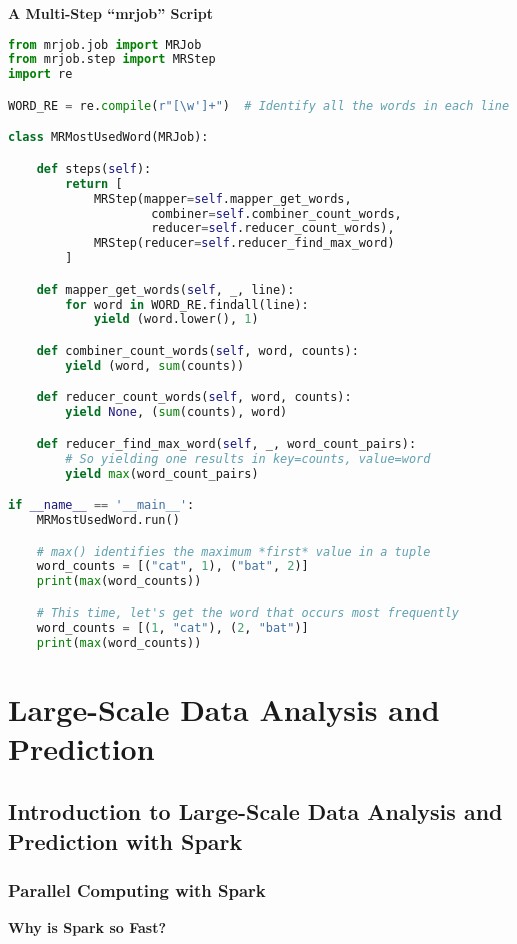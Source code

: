 \documentclass{article}
\begin{document}
\textbf{A Multi-Step ``mrjob'' Script}
\begin{lstlisting}[language=Python]
from mrjob.job import MRJob 
from mrjob.step import MRStep
import re

WORD_RE = re.compile(r"[\w']+")  # Identify all the words in each line of text

class MRMostUsedWord(MRJob):

    def steps(self):
        return [
            MRStep(mapper=self.mapper_get_words,
                    combiner=self.combiner_count_words,
                    reducer=self.reducer_count_words),
            MRStep(reducer=self.reducer_find_max_word)
        ]

    def mapper_get_words(self, _, line):
        for word in WORD_RE.findall(line):
            yield (word.lower(), 1)

    def combiner_count_words(self, word, counts):
        yield (word, sum(counts))

    def reducer_count_words(self, word, counts):
        yield None, (sum(counts), word) 

    def reducer_find_max_word(self, _, word_count_pairs):
        # So yielding one results in key=counts, value=word
        yield max(word_count_pairs)

if __name__ == '__main__':
    MRMostUsedWord.run()

    # max() identifies the maximum *first* value in a tuple
    word_counts = [("cat", 1), ("bat", 2)]
    print(max(word_counts))

    # This time, let's get the word that occurs most frequently
    word_counts = [(1, "cat"), (2, "bat")]
    print(max(word_counts))
\end{lstlisting}

\section{Large-Scale Data Analysis and Prediction}
\subsection{Introduction to Large-Scale Data Analysis and Prediction with Spark}
\subsubsection{Parallel Computing with Spark}

\textbf{Why is Spark so Fast?}
\end{document}
